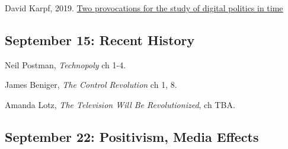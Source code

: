 \vspace{-.1in}\documentclass[11pt]{article}
\begin{document}
\noindent David Karpf, 2019. \href{https://www.tandfonline.com/doi/abs/10.1080/19331681.2019.1705222}{Two provocations for the study of digital politics in time}



\subsection*{September 15: Recent History}


Neil Postman, \textit{Technopoly} ch 1-4.

\noindent James Beniger, \textit{The Control Revolution} ch 1, 8.

\noindent Amanda Lotz, \textit{The Television Will Be Revolutionized}, ch TBA.












\subsection*{September 22: Positivism, Media Effects }
\end{document}
